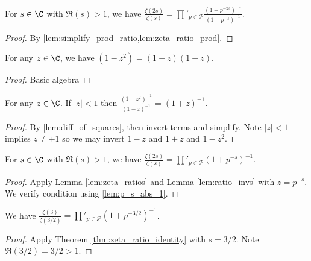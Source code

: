 \begin{lemma}\label{lem:zeta_ratios} 
\leanok
{}
For $s\in\C$ with $\Re(s)>1$, we have $\frac{\zeta(2s)}{\zeta(s)} = \prod'_{p\in\mathcal{P}}\frac{(1-p^{-2s})^{-1}}{(1-p^{-s})^{-1}}$.
\end{lemma}
\begin{proof}
\leanok
{}
By \cref{lem:simplify_prod_ratio,lem:zeta_ratio_prod}.
\end{proof}

\begin{lemma}\label{lem:diff_of_squares} 
\leanok
For any $z\in\C$, we have $(1-z^2) = (1-z)(1+z)$.
\end{lemma}
\begin{proof}
\leanok
Basic algebra
\end{proof}

\begin{lemma}\label{lem:ratio_invs} 
\leanok
For any $z\in\C$. If $|z|<1$ then $\frac{(1-z^2)^{-1}}{(1-z)^{-1}} = (1+z)^{-1}$.
\end{lemma}
\begin{proof}
\leanok
{}
By \cref{lem:diff_of_squares}, then invert terms and simplify. Note $|z|<1$ implies $z\neq\pm 1$ so we may invert $1-z$ and $1+z$ and $1-z^2$.
\end{proof}


\begin{theorem}\label{thm:zeta_ratio_identity} 
\leanok
{}
For $s\in\C$ with $\Re(s)>1$, we have $\frac{\zeta(2s)}{\zeta(s)} = \prod'_{p\in\mathcal{P}}(1+p^{-s})^{-1}$.
\end{theorem}
\begin{proof}
\leanok
{}
Apply Lemma \ref{lem:zeta_ratios} and Lemma \ref{lem:ratio_invs} with $z=p^{-s}$. We verify condition using \cref{lem:p_s_abs_1}.
\end{proof}

\begin{lemma}\label{lem:zeta_ratio_at_3_2} 
\leanok
{}
We have $\frac{\zeta(3)}{\zeta(3/2)} = \prod'_{p\in\mathcal{P}}(1+p^{-3/2})^{-1}$.
\end{lemma}
\begin{proof}
\leanok
{}
Apply Theorem \ref{thm:zeta_ratio_identity} with $s=3/2$. Note $\Re(3/2)=3/2>1$.
\end{proof}

